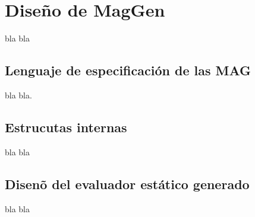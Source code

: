 \chapter{Dise\~no de MagGen}
\label{chap:disen_}
\minitoc


bla bla

\section{Lenguaje de especificaci\'on de las MAG}

bla bla.


\section{Estrucutas internas}
bla bla

\section{Disen\~o del evaluador est\'atico generado}

bla bla